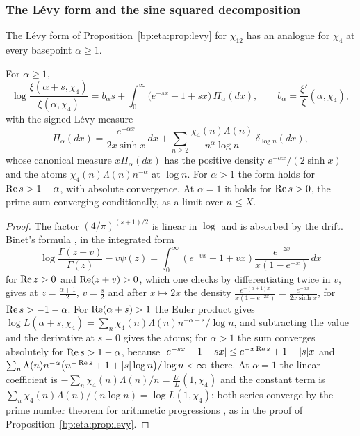 \subsubsection{The L\'evy form and the sine squared decomposition}\label{sec:dbeta:levy}

The L\'evy form of Proposition~\ref{bp:eta:prop:levy} for $\chi_{12}$ has an analogue for $\chi_4$ at every basepoint $\alpha\ge1$.

\begin{proposition}\label{prop:dbeta:levy}
For $\alpha\ge1$,
\[
\log\frac{\xi(\alpha+s,\chi_4)}{\xi(\alpha,\chi_4)}=b_\alpha s+\int_0^\infty\big(e^{-sx}-1+sx\big)\,\Pi_\alpha(dx),\qquad b_\alpha=\frac{\xi'}\xi(\alpha,\chi_4),
\]
with the signed L\'evy measure
\[
\Pi_\alpha(dx)=\frac{e^{-\alpha x}}{2x\sinh x}\,dx+\sum_{n\ge2}\frac{\chi_4(n)\Lambda(n)}{n^\alpha\log n}\,\delta_{\log n}(dx),
\]
whose canonical measure $x\Pi_\alpha(dx)$ has the positive density $e^{-\alpha x}/(2\sinh x)$ and the atoms $\chi_4(n)\Lambda(n)n^{-\alpha}$ at $\log n$. For $\alpha>1$ the form holds for $\operatorname{Re} s>1-\alpha$, with absolute convergence. At $\alpha=1$ it holds for $\operatorname{Re} s>0$, the prime sum converging conditionally, as a limit over $n\le X$.
\end{proposition}

\begin{proof}
The factor $(4/\pi)^{(s+1)/2}$ is linear in $\log$ and is absorbed by the drift. Binet's formula \cite[\S5.9]{DLMF}, in the integrated form
\[
\log\frac{\Gamma(z+v)}{\Gamma(z)}-v\psi(z)=\int_0^\infty(e^{-vx}-1+vx)\frac{e^{-zx}}{x(1-e^{-x})}\,dx
\]
for $\operatorname{Re} z>0$ and $\operatorname{Re}(z+v)>0$, which one checks by differentiating twice in $v$, gives at $z=\frac{\alpha+1}2$, $v=\frac s2$ and after $x\mapsto2x$ the density $\frac{e^{-(\alpha+1)x}}{x(1-e^{-2x})}=\frac{e^{-\alpha x}}{2x\sinh x}$, for $\operatorname{Re} s>-1-\alpha$. For $\operatorname{Re}(\alpha+s)>1$ the Euler product gives $\log L(\alpha+s,\chi_4)=\sum_n\chi_4(n)\Lambda(n)n^{-\alpha-s}/\log n$, and subtracting the value and the derivative at $s=0$ gives the atoms; for $\alpha>1$ the sum converges absolutely for $\operatorname{Re} s>1-\alpha$, because $|e^{-sx}-1+sx|\le e^{-x\operatorname{Re} s}+1+|s|x$ and $\sum_n\Lambda(n)n^{-\alpha}\big(n^{-\operatorname{Re} s}+1+|s|\log n\big)/\log n<\infty$ there. At $\alpha=1$ the linear coefficient is $-\sum_n\chi_4(n)\Lambda(n)/n=\frac{L'}L(1,\chi_4)$ and the constant term is $\sum_n\chi_4(n)\Lambda(n)/(n\log n)=\log L(1,\chi_4)$; both series converge by the prime number theorem for arithmetic progressions \cite[Chapter~20]{Davenport}, as in the proof of Proposition~\ref{bp:eta:prop:levy}.
\end{proof}

